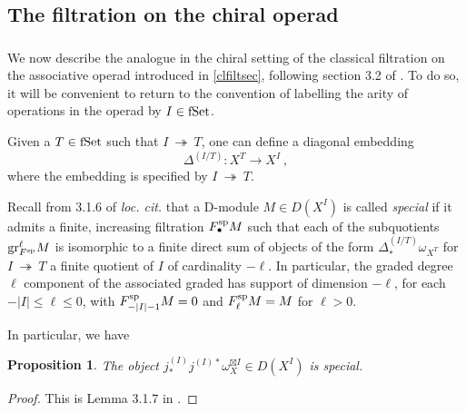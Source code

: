 \documentclass[11pt]{amsart}
\numberwithin{equation}{section}
\newtheorem{prop}[theo]{Proposition}
\theoremstyle{definition}
\newcommand{\spe}{{\textup{sp}}}
\newcommand{\OEnd}{{\textup{End}}}
\newcommand{\onto}{{\ \twoheadrightarrow\ }}
\newcommand{\Vh}{{V_\hbar}}
\newcommand{\BDh}{{\textup{BD}_\hbar}}
\newcommand{\ch}{{\textup{ch}}}
\newcommand{\fset}{{\textup{fSet}}}
\newcommand{\Ass}{{\textup{Ass}}}
\newcommand{\0}{{\textbf{0}}}
\newcommand{\DD}{{D}}
\newcommand{\gr}{\textup{gr}}
\def\ch{{\rm ch}}
\begin{document}

\subsection{The filtration on the chiral operad}




\subsubsection{}\label{specialsec} 

We now describe the analogue in the chiral setting of the classical filtration on the associative operad introduced in \ref{clfiltsec}, following section 3.2 of \cite{BD1}. To do so, it will be convenient to return to the convention of labelling the arity of operations in the operad by $I\in\fset$.

Given a $T\in \fset$ such that $I\onto T$, one can define a diagonal embedding
\[
\Delta^{(I/T)}:X^T\rightarrow X^I~,
\]
where the embedding is specified by $I\onto T$.

Recall from 3.1.6 of \emph{loc. cit.} that a D-module $M\in \DD(X^I)$ is called \emph{special} if it admits a finite, increasing filtration $F_\bullet^\spe M$ such that each of the subquotients $\gr^\ell_{F^\spe} M$ is isomorphic to a finite direct sum of objects of the form $\Delta^{(I/T)}_* \omega_{X^T}$ for $I\onto T$ a finite quotient of $I$ of cardinality $-\ell$. In particular, the graded degree $\ell$ component of the associated graded has support of dimension $-\ell$, for each $-|I|\leq \ell \leq 0$, with $F_{-|I|-1}^\spe M=0$ and $F_\ell^\spe M=M$ for $\ell >0$.


In particular, we have
\begin{prop} The object $j^{(I)}_*j^{(I)*}\omega_{X}^{\boxtimes I} \in \DD(X^I)$ is special.
\end{prop}
\begin{proof}  This is Lemma 3.1.7 in \cite{BD1}.
\end{proof}
\end{document}
